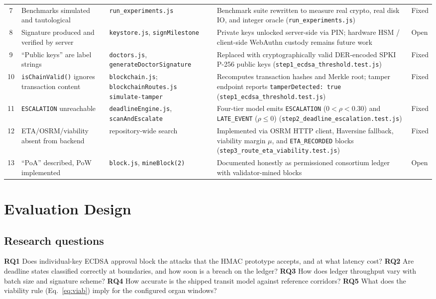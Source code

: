 \documentclass[journal]{IEEEtran}
\begin{document}
\begin{table}[t]
\begin{tabular}{@{}cp{3.0cm}p{4.2cm}p{5.4cm}l@{}}
7 & Benchmarks simulated and tautological & \texttt{run\_experiments.js} & Benchmark suite rewritten to measure real crypto, real disk IO, and integer oracle (\texttt{run\_experiments.js}) & Fixed \\
8 & Signature produced and verified by server & \texttt{keystore.js}, \texttt{signMilestone} & Private keys unlocked server-side via PIN; hardware HSM / client-side WebAuthn custody remains future work & Open \\
9 & ``Public keys'' are label strings & \texttt{doctors.js}, \texttt{generateDoctorSignature} & Replaced with cryptographically valid DER-encoded SPKI P-256 public keys (\texttt{step1\_ecdsa\_threshold.test.js}) & Fixed \\
10 & \texttt{isChainValid()} ignores transaction content & \texttt{blockchain.js}; \texttt{blockchainRoutes.js} \texttt{simulate-tamper} & Recomputes transaction hashes and Merkle root; tamper endpoint reports \texttt{tamperDetected: true} (\texttt{step1\_ecdsa\_threshold.test.js}) & Fixed \\
11 & \texttt{ESCALATION} unreachable & \texttt{deadlineEngine.js}, \texttt{scanAndEscalate} & Four-tier model emits \texttt{ESCALATION} ($0<\rho<0.30$) and \texttt{LATE\_EVENT} ($\rho\le0$) (\texttt{step2\_deadline\_escalation.test.js}) & Fixed \\
12 & ETA/OSRM/viability absent from backend & repository-wide search & Implemented via OSRM HTTP client, Haversine fallback, viability margin $\mu$, and \texttt{ETA\_RECORDED} blocks (\texttt{step3\_route\_eta\_viability.test.js}) & Fixed \\
13 & ``PoA'' described, PoW implemented & \texttt{block.js}, \texttt{mineBlock(2)} & Documented honestly as permissioned consortium ledger with validator-mined blocks & Open \\
\bottomrule
\end{tabular}
\end{table}

\section{Evaluation Design}\label{sec:eval}

\subsection{Research questions}
\textbf{RQ1} Does individual-key ECDSA approval block the attacks that the
HMAC prototype accepts, and at what latency cost? \textbf{RQ2} Are deadline
states classified correctly at boundaries, and how soon is a breach on the
ledger? \textbf{RQ3} How does ledger throughput vary with batch size and
signature scheme? \textbf{RQ4} How accurate is the shipped transit model
against reference corridors? \textbf{RQ5} What does the viability rule
(Eq.~\ref{eq:viab}) imply for the configured organ windows?
\end{document}
